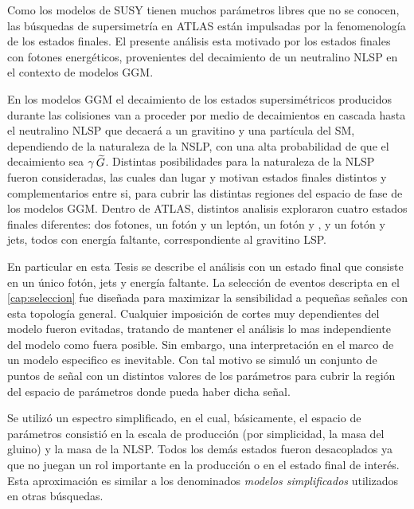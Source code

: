 Como los modelos de SUSY tienen muchos parámetros libres que no se conocen, las búsquedas de supersimetría en
ATLAS están impulsadas por la fenomenología de los estados finales. El presente
análisis esta motivado por los estados finales con fotones energéticos,
provenientes del decaimiento de un neutralino NLSP en el contexto de modelos
GGM.

En los modelos GGM el decaimiento de los estados supersimétricos producidos
durante las colisiones van a proceder por medio de decaimientos en cascada hasta
el neutralino NLSP que decaerá a un gravitino y una partícula del SM,
dependiendo de la naturaleza de la NSLP, con una alta probabilidad de que el
decaimiento sea $\gamma\,\widetilde{G}$. Distintas posibilidades para la naturaleza de la
NLSP fueron consideradas, las cuales dan lugar y motivan estados finales
distintos y complementarios entre si, para cubrir las distintas regiones
del espacio de fase de los modelos GGM.
Dentro de ATLAS, distintos analisis exploraron cuatro estados finales diferentes: dos fotones, un fotón y un
leptón, un fotón y {\bjets}, y un fotón y jets, todos con energía faltante,
correspondiente al gravitino LSP.

En particular en esta Tesis se describe el análisis con un estado final que
consiste en un único fotón, jets y energía faltante.
La selección de eventos descripta en el \cref{cap:seleccion} fue diseñada para
maximizar la sensibilidad a pequeñas señales con esta topología general.
Cualquier imposición de cortes muy dependientes del modelo fueron evitadas,
tratando de mantener el análisis lo mas independiente del modelo como fuera
posible. Sin embargo, una interpretación en el marco de un modelo especifico es
inevitable. Con tal motivo se simuló un conjunto de puntos de señal con un
distintos valores de los parámetros para cubrir la región del espacio de
parámetros donde pueda haber dicha señal.


Se utilizó un espectro simplificado, en el cual, básicamente, el espacio de parámetros
consistió en la escala de producción (por simplicidad, la masa del gluino)
y la masa de la NLSP. Todos los demás estados fueron desacoplados ya que no juegan
un rol importante en la producción o en el estado final de interés. Esta aproximación
es similar a los denominados \emph{modelos simplificados}  utilizados en otras búsquedas.

